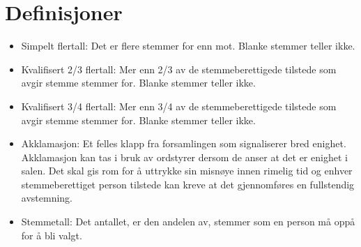 \setcounter{chapter}{-1}
\chapter{Definisjoner}
\vspace{23pt}

\begin{itemize}
    \item Simpelt flertall: Det er flere stemmer for enn mot. Blanke stemmer teller ikke. 
    \item Kvalifisert 2/3 flertall: Mer enn 2/3 av de stemmeberettigede tilstede som avgir stemme stemmer for. Blanke stemmer teller ikke. 
    \item Kvalifisert 3/4 flertall: Mer enn 3/4 av de stemmeberettigede tilstede som avgir stemme stemmer for. Blanke stemmer teller ikke.
    \item Akklamasjon: Et felles klapp fra forsamlingen som signaliserer bred enighet. Akklamasjon kan tas i bruk av ordstyrer dersom de anser at det er enighet i salen. Det skal gis rom for å uttrykke sin misnøye innen rimelig tid og enhver stemmeberettiget person tilstede kan kreve at det gjennomføres en fullstendig avstemning.
    \item Stemmetall: Det antallet, er den andelen av, stemmer som en person må oppå for å bli valgt. 
  \end{itemize}


